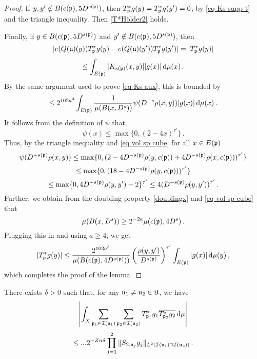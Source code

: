 \begin{proof}
    If $y,y' \notin B(c(\mathfrak p), 5D^{s(\mathfrak p)})$, then $T_\mathfrak p^*g(y) = T_\mathfrak p^*g(y') = 0$, by \eqref{eq Ks supp t} and the triangle inequality. Then \eqref{T*Hölder2} holds.

    Finally, if $y \in B(c(\mathfrak p), 5D^{s(\mathfrak p)})$ and $y' \notin B(c(\mathfrak p), 5D^{s(\mathfrak p)})$, then
    $$
        |e(Q(\mathfrak u)(y)) T_{\mathfrak p}^* g(y) - e(Q(\mathfrak u)(y')) T_{\mathfrak p}^* g(y')| = |T_\mathfrak p^* g(y)|
    $$
    $$
        \le \int_{E(\mathfrak p)} |K_{s(\mathfrak p)}(x,y)| |g(x)| \, \mathrm{d}\mu(x)\,.
    $$
    By the same argument used to prove \eqref{eq Ks aux}, this is bounded by
    $$
        \le 2^{102a^3} \int_{E(\mathfrak p)} \frac{1}{\mu(B(x, D^s))} \psi(D^{-s} \rho(x,y)) |g(x)| \, \mathrm{d}\mu(x)\,.
    $$
    It follows from the definition of $\psi$ that
    $$
        \psi(x) \le \max\{0, (2  - 4x)^{\tau'}\}\,.
    $$
    Thus, by the triangle inequality and \eqref{eq vol sp cube} for all $x\in E(\mathfrak p)$
    $$
        \psi(D^{-s(\mathfrak p)}\rho(x,y)) \le \max\{0, (2  - 4D^{-s(\mathfrak p)}\rho(y, c(\mathfrak p)) + 4 D^{-s(\mathfrak p)}\rho(x, c(\mathfrak p)))^{\tau'}\}
    $$
    $$
        \le \max\{0, (18 - 4 D^{-s(\mathfrak p)} \rho(y, c(\mathfrak p)))^{\tau'}\}
    $$
    $$
        \le \max\{0, 4 D^{-s(\mathfrak p)}\rho(y,y') - 2\}^{\tau'} \le 4 (D^{-s(\mathfrak p)}\rho(y,y'))^{\tau'}\,.
    $$
    Further, we obtain from the doubling property \eqref{doublingx} and \eqref{eq vol sp cube} that
    $$
        \mu(B(x, D^s)) \ge 2^{-2a} \mu(c(\mathfrak p), 4D^s)\,.
    $$
    Plugging this in and using $a \ge 4$, we get
    $$
        |T_\mathfrak p^* g(y)| \le   \frac{2^{103a^3}}{\mu(B(c(\mathfrak p), 4D^{s(\mathfrak p)}))} \left(\frac{\rho(y,y')}{D^{s(\mathfrak p)}}\right)^{\tau'} \int_{E(\mathfrak p)} |g(x)| \, \mathrm{d}\mu(y)\,,
    $$
    which completes the proof of the lemma.
\end{proof}


\begin{lemma}
    \label{SeparatedTrees}
    There exists $\delta > 0$  such that, for any $\mathfrak u_1 \ne \mathfrak u_2 \in \mathfrak U$, we have
    \begin{equation}
        \label{eq lhs sep tree}
        \left| \int_X \sum_{\mathfrak p_1 \in \mathfrak T(\mathfrak u_1)} \sum_{\mathfrak p_2 \in \mathfrak T(\mathfrak u_2)} T^*_{\mathfrak p_1}g_1 \overline{T^*_{\mathfrak p_2}g_2 }\,\mathrm{d}\mu \right|
    \end{equation}
    \begin{equation}
        \label{eq rhs sep tree}
        \le ... 2^{-Zn\delta} \prod_{j =1}^2 \| S_{2, \mathfrak u_j} g_j\|_{L^2(\mathcal{I}(\mathfrak u_1) \cap \mathcal{I}(\mathfrak u_2))}\,.
    \end{equation}
\end{lemma}

